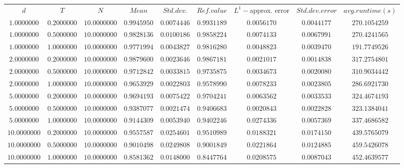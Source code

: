 \begin{tabular}{ccccccccc}
$d$ & $T$ & $N$ & $Mean$ & $Std. dev.$ & $Ref. value$ & $L^1-$approx. error & $Std. dev. error$ & $avg. runtime (s)$\\
$1.0000000$ & $0.2000000$ & $10.0000000$ & $0.9945950$ & $0.0074446$ & $0.9931189$ & $0.0056170$ & $0.0044177$ & $270.1054259$\\
$1.0000000$ & $0.5000000$ & $10.0000000$ & $0.9828136$ & $0.0100186$ & $0.9858224$ & $0.0074133$ & $0.0067991$ & $270.4241565$\\
$1.0000000$ & $1.0000000$ & $10.0000000$ & $0.9771994$ & $0.0043827$ & $0.9816280$ & $0.0048823$ & $0.0039470$ & $191.7749526$\\
$2.0000000$ & $0.2000000$ & $10.0000000$ & $0.9879600$ & $0.0023646$ & $0.9867181$ & $0.0021017$ & $0.0014838$ & $317.2754801$\\
$2.0000000$ & $0.5000000$ & $10.0000000$ & $0.9712842$ & $0.0033815$ & $0.9735875$ & $0.0034673$ & $0.0020080$ & $310.9034442$\\
$2.0000000$ & $1.0000000$ & $10.0000000$ & $0.9653929$ & $0.0022803$ & $0.9578990$ & $0.0078233$ & $0.0023805$ & $286.6921730$\\
$5.0000000$ & $0.2000000$ & $10.0000000$ & $0.9694193$ & $0.0075422$ & $0.9704241$ & $0.0063562$ & $0.0033533$ & $324.4674193$\\
$5.0000000$ & $0.5000000$ & $10.0000000$ & $0.9387077$ & $0.0021474$ & $0.9406683$ & $0.0020843$ & $0.0022828$ & $323.1384041$\\
$5.0000000$ & $1.0000000$ & $10.0000000$ & $0.9144309$ & $0.0053940$ & $0.9402246$ & $0.0274336$ & $0.0057369$ & $337.4686582$\\
$10.0000000$ & $0.2000000$ & $10.0000000$ & $0.9557587$ & $0.0254601$ & $0.9510989$ & $0.0188321$ & $0.0174150$ & $439.5765079$\\
$10.0000000$ & $0.5000000$ & $10.0000000$ & $0.9010498$ & $0.0249808$ & $0.9001849$ & $0.0221864$ & $0.0124885$ & $459.5426078$\\
$10.0000000$ & $1.0000000$ & $10.0000000$ & $0.8581362$ & $0.0148000$ & $0.8447764$ & $0.0208575$ & $0.0087043$ & $452.4639577$\\
\end{tabular}
